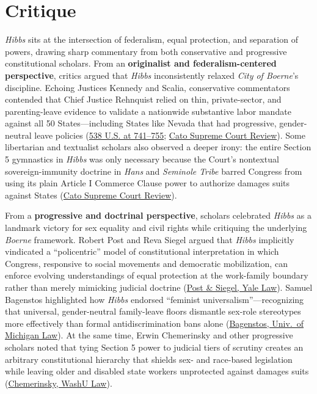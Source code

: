\documentclass[12pt]{article}
\begin{document}
\section{Critique}
\textit{Hibbs} sits at the intersection of federalism, equal protection, and separation of powers, drawing sharp commentary from both conservative and progressive constitutional scholars. From an \textbf{originalist and federalism-centered perspective}, critics argued that \textit{Hibbs} inconsistently relaxed \textit{City of Boerne}'s discipline. Echoing Justices Kennedy and Scalia, conservative commentators contended that Chief Justice Rehnquist relied on thin, private-sector, and parenting-leave evidence to validate a nationwide substantive labor mandate against all 50 States---including States like Nevada that had progressive, gender-neutral leave policies (\href{https://supreme.justia.com/cases/federal/us/538/721/}{538 U.S. at 741--755}; \href{https://www.cato.org/supreme-court-review/2003-2004/tennessee-v-lane-how-illegitimate-power-negated-non-existent-immunity}{Cato Supreme Court Review}). Some libertarian and textualist scholars also observed a deeper irony: the entire Section 5 gymnastics in \textit{Hibbs} was only necessary because the Court's nontextual sovereign-immunity doctrine in \textit{Hans} and \textit{Seminole Tribe} barred Congress from using its plain Article I Commerce Clause power to authorize damages suits against States (\href{https://www.cato.org/supreme-court-review/2003-2004/tennessee-v-lane-how-illegitimate-power-negated-non-existent-immunity}{Cato Supreme Court Review}).

From a \textbf{progressive and doctrinal perspective}, scholars celebrated \textit{Hibbs} as a landmark victory for sex equality and civil rights while critiquing the underlying \textit{Boerne} framework. Robert Post and Reva Siegel argued that \textit{Hibbs} implicitly vindicated a ``policentric'' model of constitutional interpretation in which Congress, responsive to social movements and democratic mobilization, can enforce evolving understandings of equal protection at the work-family boundary rather than merely mimicking judicial doctrine (\href{https://law.yale.edu/sites/default/files/documents/pdf/Faculty/Siegel_LegislativeConstitutionalismAndSectionFivePower.pdf}{Post \& Siegel, Yale Law}). Samuel Bagenstos highlighted how \textit{Hibbs} endorsed ``feminist universalism''---recognizing that universal, gender-neutral family-leave floors dismantle sex-role stereotypes more effectively than formal antidiscrimination bans alone (\href{https://repository.law.umich.edu/cgi/viewcontent.cgi?article=1182&context=book_chapters}{Bagenstos, Univ.\ of Michigan Law}). At the same time, Erwin Chemerinsky and other progressive scholars noted that tying Section 5 power to judicial tiers of scrutiny creates an arbitrary constitutional hierarchy that shields sex- and race-based legislation while leaving older and disabled state workers unprotected against damages suits (\href{https://openscholarship.wustl.edu/cgi/viewcontent.cgi?referer=&httpsredir=1&article=1395&context=law_journal_law_policy}{Chemerinsky, WashU Law}).
\end{document}
